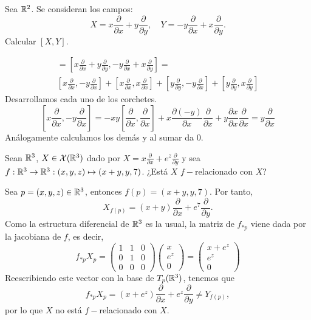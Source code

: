 \documentclass[twoside]{article}
\begin{document}
\newpage

\begin{ejercicio}{3}
Sea $\mathbb{R}^2$. Se consideran los campos:
\[
X=x\frac{\partial}{\partial x}+y\frac{\partial}{\partial y},\quad Y=-y\frac{\partial}{\partial x}+x\frac{\partial}{\partial y}.
\]
Calcular $[X,Y]$.
\end{ejercicio}
\begin{solucion}
\begin{gather*}
[X,Y]=\left[x\frac{\partial}{\partial x}+y\frac{\partial}{\partial y}, -y\frac{\partial}{\partial x}+x\frac{\partial}{\partial y}\right]=\\
\left[x\frac{\partial}{\partial x},-y\frac{\partial}{\partial x}\right]+\left[x\frac{\partial}{\partial x},x\frac{\partial}{\partial x}\right]+\left[y\frac{\partial}{\partial y},-y\frac{\partial}{\partial x}\right]+\left[y\frac{\partial}{\partial y},x\frac{\partial}{\partial y}\right]
\end{gather*}
Desarrollamos cada uno de los corchetes.
\[
\left[x\frac{\partial}{\partial x},-y\frac{\partial}{\partial x}\right]=-xy\left[\frac{\partial}{\partial x},\frac{\partial}{\partial x}\right]+x\frac{
\partial (-y)}{\partial x}\frac{\partial}{\partial x}+y\frac{\partial x}{\partial x}\frac{\partial}{\partial x}=y\frac{\partial}{\partial x}
\]
Análogamente calculamos los demás y al sumar da 0.
\end{solucion}

\begin{ejercicio}{6}
Sean $\mathbb{R}^3$, $X \in \mathcal{X}(\mathbb{R}^3)$ dado por $X = x\frac{\partial}{\partial x} + e^z\frac{\partial}{\partial y}$ y sea $f :
\mathbb{R}^3 \to \mathbb{R}^3 : (x, y, z) \mapsto (x + y, y, 7)$. ¿Está $X$ $f-$relacionado con $X$?
\end{ejercicio}
\begin{solucion}
Sea $p=(x,y,z)\in\mathbb{R}^3$, entonces $f(p)=(x+y,y,7)$. Por tanto, $$X_{f(p)}=(x+y)\frac{\partial}{\partial x} + e^7\frac{\partial}{\partial y}.$$ %
Como la estructura diferencial de $\mathbb{R}^3$ es la usual, la matriz de $f_{*p}$ viene dada por la jacobiana de $f$, es decir, 
\[f_{*p}X_p=\begin{pmatrix}
1 & 1 & 0\\
0 & 1 & 0\\
0 & 0 & 0
\end{pmatrix}\begin{pmatrix}
x\\
e^z\\
0
\end{pmatrix}=\begin{pmatrix}
x+e^z\\
e^z\\
0
\end{pmatrix}\]
Reescribiendo este vector con la base de $T_p(\mathbb{R}^3)$, tenemos que 
$$f_{*p}X_p=(x+e^z)\frac{\partial}{\partial x} + e^z\frac{\partial}{\partial y}\neq Y_{f(p)},$$
por lo que $X$ no está $f-$relacionado con $X$.
\end{solucion}
\end{document}
